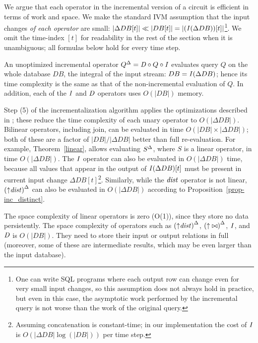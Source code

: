 We argue that each operator in the incremental version of a circuit is
efficient in terms of work and space.  We make the standard IVM
assumption that the input changes \emph{of each operator} are small:
$|\Delta DB[t]| \ll |DB[t]| = |(\mathit{I}(\Delta DB))[t]|$\footnote{One can
write SQL programs where each output row can change even for very
small input changes, so this assumption does not always hold in
practice, but even in this case, the asymptotic work performed by the
incremental query is not worse than the work of the original query.}.
We omit the time-index $[t]$ for readability in the rest of the
section when it is unambiguous; all formulas below hold for every time
step.

An unoptimized incremental operator ${Q}^{\Delta} = \mathit{D} \circ Q \circ \mathit{I}$
evaluates query $Q$ on the whole database $DB$, the integral of the
input stream: $DB = \mathit{I}(\Delta DB)$; hence its time complexity is the
same as that of the non-incremental evaluation of $Q$.  In addition,
each of the $\mathit{I}$ and $\mathit{D}$ operators uses $O(|DB|)$ memory.

Step (5) of the incrementalization algorithm applies the optimizations
described in ; these reduce the time
complexity of each unary operator to $O(|\Delta DB|)$.  Bilinear
operators, including join, can be evaluated in time $O(|DB| \times
|\Delta DB|)$; both of these are a factor of $|DB| / |\Delta DB|$
better than full re-evaluation.  For example, Theorem~\ref{linear},
allows evaluating ${S}^{\Delta}$, where $S$ is a linear operator, in time
$O(|\Delta DB|)$.  The $\mathit{I}$ operator can also be evaluated in
$O(|\Delta DB|)$ time, because all values that appear in the output of
$\mathit{I}(\Delta DB)[t]$ must be present in current input change $\Delta
DB[t]$\footnote{Assuming concatenation is constant-time; in our
implementation the cost of $\mathit{I}$ is $O(|\Delta DB| \log(|DB|))$ per
time step.}.  Similarly, while the $\mathit{dist}$ operator is not linear,
${({\uparrow}\mathit{dist})}^{\Delta}$ can also be evaluated in $O(|\Delta DB|)$
according to Proposition~\ref{prop-inc_distinct}.

The space complexity of linear operators is zero (O(1)), since they
store no data persistently.  The space complexity of operators such as
${({\uparrow}\mathit{dist})}^{\Delta}$, ${({\uparrow}\bowtie)}^{\Delta}$, $\mathit{I}$, and $\mathit{D}$
is $O(|DB|)$.  They need to store their input or output relations in
full (moreover, some of these are intermediate results, which may be
even larger than the input database).
